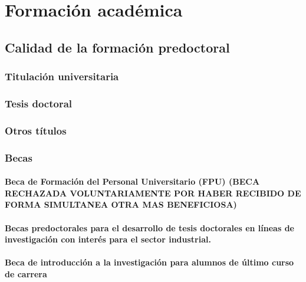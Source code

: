\documentclass[a4paper, 11pt, twoside, openright]{report}
\begin{document}
\chapter{Formación académica}



\section{Calidad de la formación predoctoral}

\subsection{Titulación universitaria}



\subsection{Tesis doctoral}



\subsection{Otros títulos}

\subsection{Becas}

\subsubsection{Beca de Formación del Personal Universitario (FPU) (BECA RECHAZADA VOLUNTARIAMENTE POR HABER RECIBIDO DE FORMA SIMULTANEA OTRA MAS BENEFICIOSA)}


\subsubsection{Becas predoctorales para el desarrollo de tesis doctorales en líneas de investigación con interés para el sector industrial.}


\subsubsection{Beca de introducción a la investigación para alumnos de último curso de carrera}

\end{document}
